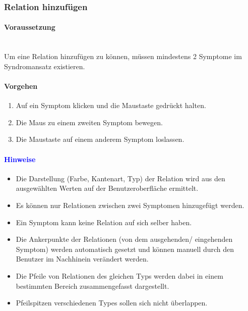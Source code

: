 \documentclass[enabledeprecatedfontcommands,fontsize=11pt,paper=a4,twoside]{scrartcl}
\newcounter{one}
\newcommand*{\hint}{\paragraph{\textcolor{blue}{Hinweise}}}
\newcommand*{\condition}{\paragraph{Voraussetzung}$\;$ \vspace{0.2cm}\\}
\newcommand*{\action}{\paragraph{Vorgehen}}
\begin{document}
		\subsubsection{Relation hinzufügen}
		\condition
		Um eine Relation hinzufügen zu können, müssen mindestens 2 Symptome im Syndromansatz existieren. 
		\action
		\begin{enumerate}
			\item Auf ein Symptom klicken und die Maustaste gedrückt halten.
			\item Die Maus zu einem zweiten Symptom bewegen. 
			\item Die Maustaste auf einem anderem Symptom loslassen. 
		\end{enumerate}
		\hint
		\begin{itemize}
			\item Die Darstellung (Farbe, Kantenart, Typ) der Relation wird aus den ausgewählten Werten auf der Benutzeroberfläche ermittelt. 
			\item Es können nur Relationen zwischen zwei Symptomen hinzugefügt werden. 
			\item Ein Symptom kann keine Relation auf sich selber haben.
			\item Die Ankerpunkte der Relationen (von dem ausgehenden/ eingehenden Symptom) werden automatisch gesetzt und können manuell durch den Benutzer im Nachhinein verändert werden. 
			\item Die Pfeile von Relationen des gleichen Typs werden dabei in einem bestimmten Bereich zusammengefasst dargestellt. 
			\item Pfeilspitzen verschiedenen Types sollen sich nicht überlappen.
		\end{itemize}
	
		\begin{figure}[ht!]
			\centering
		\end{figure}
		
		\newpage
\end{document}
